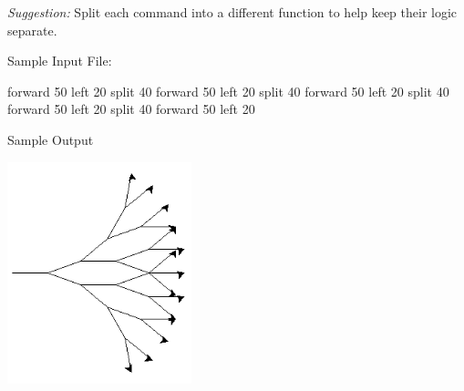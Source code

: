 \documentclass[11pt]{cselabheader}
\begin{document}
\begin{ex}[navigate3.py]
    \emph{Suggestion:} Split each command into a different function to help keep their logic separate.

    Sample Input File:

    \begin{verbatimcode}
forward 50
left 20
split 40
forward 50
left 20
split 40
forward 50
left 20
split 40
forward 50
left 20
split 40
forward 50
left 20
    \end{verbatimcode}

    Sample Output
    \begin{center}
      \includegraphics[width=0.4\textwidth]{img/nav3_example}
    \end{center}
  \end{ex}
\end{document}
